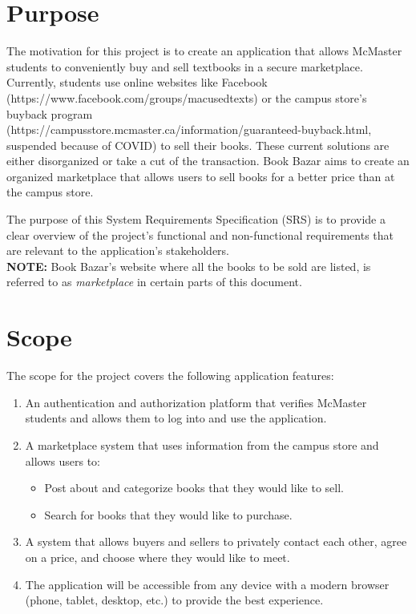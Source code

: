 \documentclass[fullpage]{article}
\newcommand{\be}{\begin{enumerate}}
\newcommand{\ee}{\end{enumerate}}
\newcommand{\bi}{\begin{itemize}}
\newcommand{\ei}{\end{itemize}}
\begin{document}
\section{Purpose}
The motivation for this project is to create an application that allows McMaster students to conveniently buy and sell textbooks in a secure marketplace. Currently, students use online websites like Facebook (https://www.facebook.com/groups/macusedtexts) or the campus store’s buyback program \\ (https://campusstore.mcmaster.ca/information/guaranteed-buyback.html, suspended because of COVID) to sell their books. These current solutions are either disorganized or take a cut of the transaction. Book Bazar aims to create an organized marketplace that allows users to sell books for a better price than at the campus store.

The purpose of this System Requirements Specification (SRS) is to provide a clear overview of the project’s functional and non-functional requirements that are relevant to the application’s stakeholders.\\ %
\newline
\small{ \textbf{NOTE:} Book Bazar's website where all the books to be sold are listed, is referred to as \textit{marketplace} in certain parts of this document.}
\section{Scope}
The scope for the project covers the following application features:
\be
	\item An authentication and authorization platform that verifies McMaster students and allows them to log into and use the application.
	\item A marketplace system that uses information from the campus store and allows users to:
		\bi
			\item Post about and categorize books that they would like to sell.
			\item Search for books that they would like to purchase.
		\ei
	\item A system that allows buyers and sellers to privately contact each other, agree on a price, and choose where they would like to meet.
	\item The application will be accessible from any device with a modern browser (phone, tablet, desktop, etc.) to provide the best experience.
\ee
\end{document}
